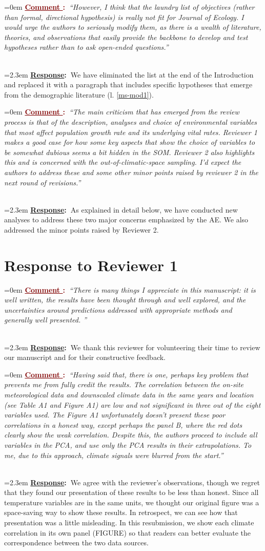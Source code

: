 \documentclass[12pt]{article}
\newcounter{cN}
\newcommand{\comment}[1]{
	\vspace{2em}
	\refstepcounter{cN} %
	\noindent \hangindent=0em \textbf{\textcolor{Maroon}{\uline{Comment \thecN}:~}}\emph{``#1''}
	}
\newcommand{\response}[1]{
	\\[0.25em]
	\hangindent=2.3em \textbf{\textcolor{NavyBlue}{\uline{Response}:~}}#1
	}
\begin{document}
\comment{However, I think that the laundry list of objectives (rather than formal, directional hypothesis) is really not fit for Journal of Ecology. I would urge the authors to seriously modify them, as there is a wealth of literature, theories, and observations that easily provide the backbone to develop and test hypotheses rather than to ask open-ended questions.}
\response{We have eliminated the list at the end of the Introduction and replaced it with a paragraph that includes specific hypotheses that emerge from the demographic literature (l. \ref{ms-mod1}).}

\comment{The main criticism that has emerged from the review process is that of the description, analyses and choice of environmental variables that most affect population growth rate and its underlying vital rates. Reviewer 1 makes a good case for how some key aspects that show the choice of variables to be somewhat dubious seems a bit hidden in the SOM. Reviewer 2 also highlights this and is concerned with the out-of-climatic-space sampling. I'd expect the authors to address these and some other minor points raised by reviewer 2 in the next round of revisions.}
\response{As explained in detail below, we have conducted new analyses to address these two major concerns emphasized by the AE.
We also addressed the minor points raised by Reviewer 2.
}

\section{Response to Reviewer 1}
\vspace{-2em}

\comment{There is many things I appreciate in this manuscript: it is well written, the results have been thought through and well explored, and the uncertainties around predictions addressed with appropriate methods and generally well presented. }
\response{We thank this reviewer for volunteering their time to review our manuscript and for their constructive feedback.}

\comment{Having said that, there is one, perhaps key problem that prevents me from fully credit the results. The correlation between the on-site meteorological data and downscaled climate data in the same years and location (see Table A1 and Figure A1) are low and not significant in three out of the eight variables used. The Figure A1 unfortunately doesn't present these poor correlations in a honest way, except perhaps the panel B, where the red dots clearly show the weak correlation. Despite this, the authors proceed to include all variables in the PCA, and use only the PCA results in their extrapolations. To me, due to this approach, climate signals were blurred from the start.}
\response{We agree with the reviewer's observations, though we regret that they found our presentation of these results to be less than honest.
Since all temperature variables are in the same units, we thought our original figure was a space-saving way to show these results.
In retrospect, we can see how that presentation was a little misleading. 
In this resubmission, we show each climate correlation in its own panel (FIGURE) so that readers can better evaluate the correspondence between the two data sources. }
\end{document}
